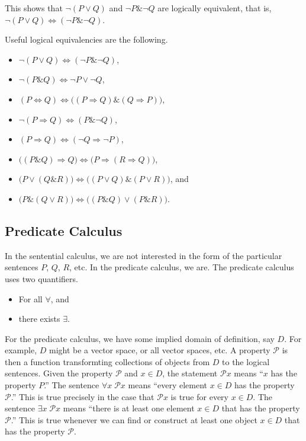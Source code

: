 \documentclass[a4paper,11pt]{article}
\newcommand{\PP}{\mathscr{P}}
\begin{document}
\noindent This shows that $\neg(P \vee Q)$ and $\neg P \& \neg Q$ are logically
equivalent, that is, $\neg(P \vee Q) \Leftrightarrow (\neg P \& \neg Q)$.

Useful logical equivalencies are the following.
\begin{itemize}
\item $\neg(P \vee Q) \Leftrightarrow (\neg P \& \neg Q)$,
\item $\neg(P \& Q) \Leftrightarrow \neg P \vee \neg Q$,
\item $(P \Leftrightarrow Q) \Leftrightarrow \Big( (P \Rightarrow Q) \& (Q
  \Rightarrow P) \Big)$,
\item $\neg(P \Rightarrow Q) \Leftrightarrow (P \& \neg Q)$,
\item $(P \Rightarrow Q) \Leftrightarrow (\neg Q \Rightarrow \neg P)$,
\item $\Big( (P\&Q)\Rightarrow Q \Big) \Leftrightarrow \Big( P \Rightarrow (R
  \Rightarrow Q) \Big)$,
\item $\Big( P \vee (Q \& R) \Big) \Leftrightarrow \Big( (P \vee Q)\&(P \vee R)
  \Big)$, and
\item $\Big( P\&(Q \vee R) \Big) \Leftrightarrow \Big( (P\&Q)\vee(P\&R) \Big)$.
\end{itemize}

\subsection*{Predicate Calculus}

In the sentential calculus, we are not interested in the form of the particular
sentences $P$, $Q$, $R$, etc. In the predicate calculus, we are. The predicate
calculus uses two quantifiers.
\begin{itemize}
\item For all $\forall$, and
\item there exists $\exists$.
\end{itemize}

\noindent For the predicate calculus, we have some implied domain of definition,
say $D$. For example, $D$ might be a vector space, or all vector spaces, etc. A
property $\PP$ is then a function transformting collections of objects from $D$
to the logical sentences. Given the property $\PP$ and $x \in D$, the statement
$\PP x$ means ``$x$ has the property $P$.'' The sentence $\forall x\;\PP x$
means ``every element $x \in D$ has the property $\PP$.'' This is true precisely
in the case that $\PP x$ is true for every $x \in D$. The sentence $\exists
x\;\PP x$ means ``there is at least one element $x \in D$ that has the property
$\PP$.'' This is true whenever we can find or construct at least one object $x
\in D$ that has the property $\PP$.
\end{document}
